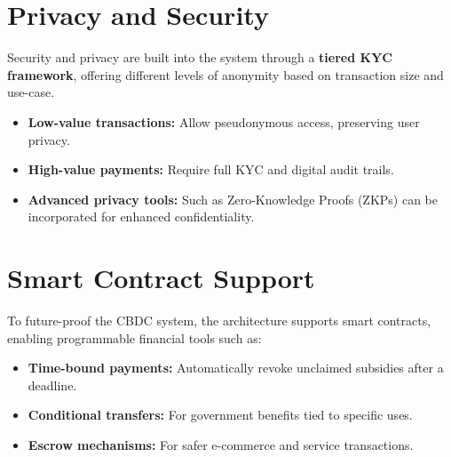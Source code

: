 \section{Privacy and Security}

Security and privacy are built into the system through a \textbf{tiered KYC framework}, offering different levels of anonymity based on transaction size and use-case.

\begin{itemize}
    \item \textbf{Low-value transactions:} Allow pseudonymous access, preserving user privacy.
    \item \textbf{High-value payments:} Require full KYC and digital audit trails.
    \item \textbf{Advanced privacy tools:} Such as Zero-Knowledge Proofs (ZKPs) can be incorporated for enhanced confidentiality.
\end{itemize}

\section{Smart Contract Support}

To future-proof the CBDC system, the architecture supports smart contracts, enabling programmable financial tools such as:

\begin{itemize}
    \item \textbf{Time-bound payments:} Automatically revoke unclaimed subsidies after a deadline.
    \item \textbf{Conditional transfers:} For government benefits tied to specific uses.
    \item \textbf{Escrow mechanisms:} For safer e-commerce and service transactions.
\end{itemize}
\vspace{-5mm}
